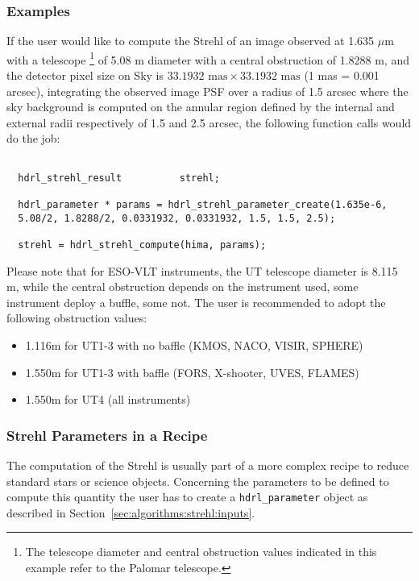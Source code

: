 \subsubsection{Examples}
\label{sec:algorithms:strehl:example}

If the user would like to compute the Strehl of an image observed at
1.635 $\mu$m with a telescope 
\footnote{The telescope diameter and central
  obstruction values indicated in this example refer to the Palomar 
telescope.} 
of 5.08 m diameter with a central obstruction of 1.8288 m,
and the detector pixel size on Sky is
$33.1932 \mbox{ mas} \times 33.1932 \mbox{ mas}$ (1 mas = 0.001 arcsec), 
integrating the observed image PSF over
a radius of 1.5 arcsec where the sky background is computed on the
annular region defined by the internal and external radii respectively
of 1.5 and 2.5 arcsec, the following function calls would do the job:  

\begin{lstlisting}

  hdrl_strehl_result          strehl;

  hdrl_parameter * params = hdrl_strehl_parameter_create(1.635e-6,
  5.08/2, 1.8288/2, 0.0331932, 0.0331932, 1.5, 1.5, 2.5);

  strehl = hdrl_strehl_compute(hima, params);
\end{lstlisting}

Please note that for ESO-VLT instruments, the UT telescope diameter is
8.115 m, while the central obstruction depends on the instrument used,
some instrument deploy a buffle, some not. The user is recommended to
adopt the following obstruction values:
\begin{itemize}
\item 1.116m for UT1-3 with no baffle (KMOS, NACO, VISIR, SPHERE)
\item 1.550m for UT1-3 with baffle (FORS, X-shooter, UVES, FLAMES)
\item 1.550m for UT4 (all instruments) 
\end{itemize}

\subsubsection{Strehl Parameters in a Recipe}
The computation of the Strehl is usually part of a more complex recipe
to reduce standard stars or science objects. Concerning the parameters
to be defined to compute this quantity the user has to create a 
\verb+hdrl_parameter+ object as described in 
Section~\ref{sec:algorithms:strehl:inputs}.
